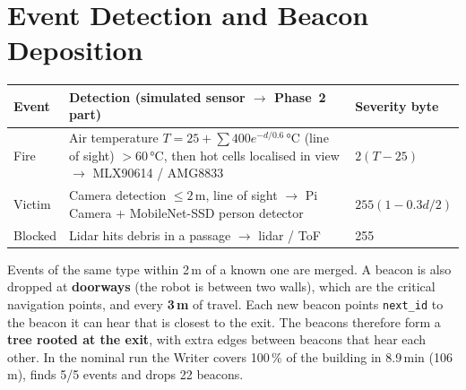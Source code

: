 \documentclass[10pt,a4paper]{article}
\begin{document}
\section{Event Detection and Beacon Deposition}
\begin{tabularx}{\linewidth}{@{}lXl@{}}
\toprule
\textbf{Event} & \textbf{Detection (simulated sensor $\rightarrow$ Phase~2 part)} & \textbf{Severity byte}\\
\midrule
Fire & Air temperature $T=25+\sum 400e^{-d/0.6}$\,°C (line of sight) $>60$\,°C, then hot cells localised in view $\rightarrow$ MLX90614 / AMG8833 & $2(T-25)$\\
Victim & Camera detection $\le2$\,m, line of sight $\rightarrow$ Pi Camera + MobileNet-SSD person detector & $255(1-0.3d/2)$\\
Blocked & Lidar hits debris in a passage $\rightarrow$ lidar / ToF & 255\\
\bottomrule
\end{tabularx}

Events of the same type within 2\,m of a known one are merged. A beacon is also dropped at \textbf{doorways}
(the robot is between two walls), which are the critical navigation points, and every \textbf{3\,m} of travel.
Each new beacon points \texttt{next\_id} to the beacon it can hear that is closest to the exit. The beacons therefore
form a \textbf{tree rooted at the exit}, with extra edges between beacons that hear each other. In the nominal run the
Writer covers 100\,\% of the building in 8.9\,min (106\,m), finds 5/5 events and drops 22 beacons.
\end{document}
